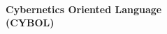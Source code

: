 %
%
%
%
%
%

\begin{center}
    \begin{Large}
        \authormacro\\
    \end{Large}
    \vspace*{1cm}
    \begin{huge}
        \textbf{Cybernetics Oriented Language\\
        (CYBOL)}\\
    \end{huge}
    \vspace{1cm}
    \begin{normalsize}
        \subtitlemacro\\
        \vspace{1cm}
        \textbf{\versionmacro}\\
        \vspace{6cm}

\end{normalsize}
\end{center}
